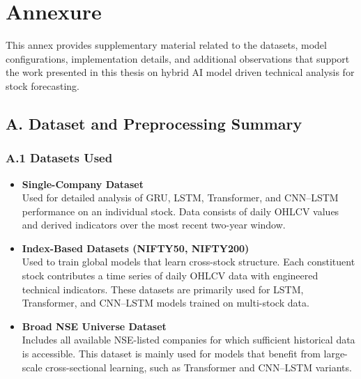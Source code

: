 \appendix
\chapter*{Annexure}

This annex provides supplementary material related to the datasets, model configurations, implementation details, and additional observations that support the work presented in this thesis on hybrid AI model driven technical analysis for stock forecasting.

\vspace{1em}

\section*{A. Dataset and Preprocessing Summary}

\subsection*{A.1 Datasets Used}

\begin{itemize}
    \item \textbf{Single-Company Dataset}\\
    Used for detailed analysis of GRU, LSTM, Transformer, and CNN--LSTM performance on an individual stock. Data consists of daily OHLCV values and derived indicators over the most recent two-year window.

    \item \textbf{Index-Based Datasets (NIFTY50, NIFTY200)}\\
    Used to train global models that learn cross-stock structure. Each constituent stock contributes a time series of daily OHLCV data with engineered technical indicators. These datasets are primarily used for LSTM, Transformer, and CNN--LSTM models trained on multi-stock data.

    \item \textbf{Broad NSE Universe Dataset}\\
    Includes all available NSE-listed companies for which sufficient historical data is accessible. This dataset is mainly used for models that benefit from large-scale cross-sectional learning, such as Transformer and CNN--LSTM variants.
\end{itemize}

